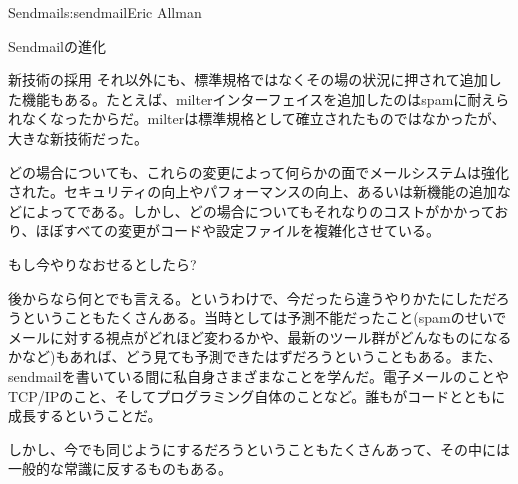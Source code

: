 \begin{aosachapter}{Sendmail}{s:sendmail}{Eric Allman}
\begin{aosasect1}{Sendmailの進化}
\begin{aosasect2}{新技術の採用}
それ以外にも、標準規格ではなくその場の状況に押されて追加した機能もある。たとえば、milterインターフェイスを追加したのはspamに耐えられなくなったからだ。milterは標準規格として確立されたものではなかったが、大きな新技術だった。

どの場合についても、これらの変更によって何らかの面でメールシステムは強化された。セキュリティの向上やパフォーマンスの向上、あるいは新機能の追加などによってである。しかし、どの場合についてもそれなりのコストがかかっており、ほぼすべての変更がコードや設定ファイルを複雑化させている。

\end{aosasect2}

\end{aosasect1}

\begin{aosasect1}{もし今やりなおせるとしたら?}

後からなら何とでも言える。というわけで、今だったら違うやりかたにしただろうということもたくさんある。当時としては予測不能だったこと(spamのせいでメールに対する視点がどれほど変わるかや、最新のツール群がどんなものになるかなど)もあれば、どう見ても予測できたはずだろうということもある。また、sendmailを書いている間に私自身さまざまなことを学んだ。電子メールのことやTCP/IPのこと、そしてプログラミング自体のことなど。誰もがコードとともに成長するということだ。

しかし、今でも同じようにするだろうということもたくさんあって、その中には一般的な常識に反するものもある。


\end{aosasect1}
\end{aosachapter}
